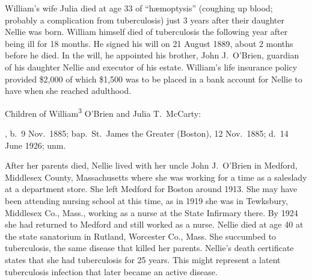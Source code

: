 William's wife Julia died at age 33 of ``h\ae moptysis'' (coughing up blood; probably a complication from tuberculosis) just 3 years after their daughter Nellie was born.\cite{JuliaMcCartyDeath:2} William himself died of tuberculosis the following year after being ill for 18 months.\cite{William3OBrienDeath:2} He signed his will on 21 August 1889, about 2 months before he died. In the will, he appointed his brother, John J.\ O'Brien, guardian of his daughter Nellie and executor of his estate. William's life insurance policy provided \$2,000 of which \$1,500 was to be placed in a bank account for Nellie to have when she reached adulthood.\cite{WilliamOBrienWill}

\begin{KidsIntro}
	Children of William\textsuperscript{3} O'Brien and Julia T.\ McCarty:
\end{KidsIntro}

\begin{Kids}
	, b.\ 9 Nov.\ 1885;\cite{Ellen4OBrienBirth} bap.\ St.\ James the Greater (Boston), 12 Nov.\ 1885;\cite{Ellen4OBrienBaptism} d.\ 14 June 1926;\cite{Ellen4OBrienDeath:1} unm.
	
	\begin{KidsMoreText}
		After her parents died, Nellie lived with her uncle John J.\ O'Brien in Medford, Middlesex County, Massachusetts\cite{Census1900EllenOBrien} where she was working for a time as a saleslady at a department store.\cite{Census1910EllenOBrien} She left Medford for Boston around 1913.\cite{Ellen4OBrien1914} She may have been attending nursing school at this time, as in 1919 she was in Tewksbury, Middlesex Co., Mass., working as a nurse at the State Infirmary there.\cite{Ellen4OBrien1919} By 1924 she had returned to Medford and still worked as a nurse.\cite{Ellen4OBrien1924} Nellie died at age 40 at the state sanatorium in Rutland, Worcester Co., Mass.\cite{Ellen4OBrienDeath:2} She succumbed to tuberculosis,\cite{Ellen4OBrienDeath2:1} the same disease that killed her parents. Nellie's death certificate states that she had tuberculosis for 25 years.\cite{Ellen4OBrienDeath2:2} This might represent a latent tuberculosis infection that later became an active disease.\cite{CDC}
	\end{KidsMoreText}

\end{Kids}